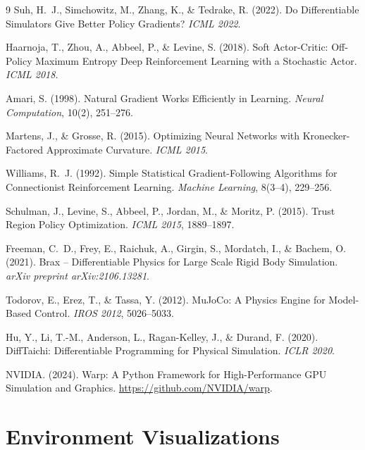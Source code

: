 \documentclass[11pt,a4paper]{article}
\begin{document}
\begin{thebibliography}{9}
  Suh, H.~J., Simchowitz, M., Zhang, K., \& Tedrake, R. (2022).
  Do Differentiable Simulators Give Better Policy Gradients?
  \textit{ICML 2022}.

  Haarnoja, T., Zhou, A., Abbeel, P., \& Levine, S. (2018).
  Soft Actor-Critic: Off-Policy Maximum Entropy Deep Reinforcement Learning with a Stochastic Actor.
  \textit{ICML 2018}.

  Amari, S. (1998).
  Natural Gradient Works Efficiently in Learning.
  \textit{Neural Computation}, 10(2), 251--276.

  Martens, J., \& Grosse, R. (2015).
  Optimizing Neural Networks with Kronecker-Factored Approximate Curvature.
  \textit{ICML 2015}.

  Williams, R.~J. (1992).
  Simple Statistical Gradient-Following Algorithms for Connectionist Reinforcement Learning.
  \textit{Machine Learning}, 8(3--4), 229--256.

  Schulman, J., Levine, S., Abbeel, P., Jordan, M., \& Moritz, P. (2015).
  Trust Region Policy Optimization.
  \textit{ICML 2015}, 1889--1897.

  Freeman, C.~D., Frey, E., Raichuk, A., Girgin, S., Mordatch, I., \& Bachem, O. (2021).
  Brax -- Differentiable Physics for Large Scale Rigid Body Simulation.
  \textit{arXiv preprint arXiv:2106.13281}.

  Todorov, E., Erez, T., \& Tassa, Y. (2012).
  MuJoCo: A Physics Engine for Model-Based Control.
  \textit{IROS 2012}, 5026--5033.

  Hu, Y., Li, T.-M., Anderson, L., Ragan-Kelley, J., \& Durand, F. (2020).
  DiffTaichi: Differentiable Programming for Physical Simulation.
  \textit{ICLR 2020}.

  NVIDIA. (2024).
  Warp: A Python Framework for High-Performance GPU Simulation and Graphics.
  \url{https://github.com/NVIDIA/warp}.

\end{thebibliography}

\appendix

\section{Environment Visualizations}
\label{sec:appendix_vis}
\end{document}
